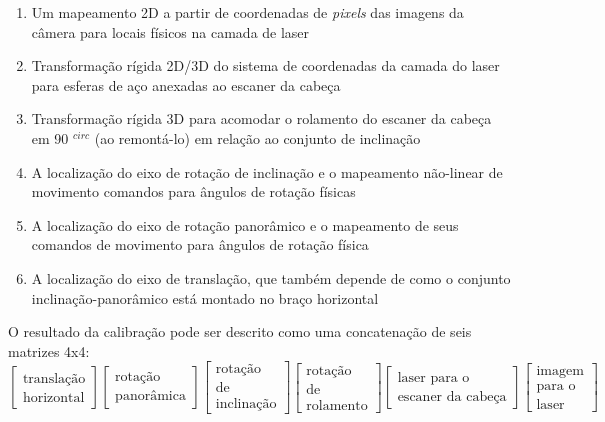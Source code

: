 \begin{enumerate}
\item{Um mapeamento 2D a partir de coordenadas de {\it pixels} das imagens da câmera para locais físicos na camada de laser}
\item{Transformação rígida 2D/3D do sistema de coordenadas da camada do laser para esferas de aço anexadas ao escaner da cabeça}
\item{Transformação rígida 3D para acomodar o rolamento do escaner da cabeça em 90 $^{circ}$ (ao remontá-lo) em relação ao conjunto de inclinação}
\item{A localização do eixo de rotação de inclinação e o mapeamento não-linear de movimento comandos para ângulos de rotação físicas}
\item{A localização do eixo de rotação panorâmico e o mapeamento de seus comandos de movimento para ângulos de rotação física}
\item{A localização do eixo de translação, que também depende de como o conjunto inclinação-panorâmico está montado no braço horizontal}
\end{enumerate}

O resultado da calibração pode ser descrito como uma concatenação de seis matrizes 4x4:
\[
\begin{bmatrix}
\text{translação} \\ 
\text{horizontal}
\end{bmatrix}
\begin{bmatrix}
\text{rotação} \\ 
\text{panorâmica}
\end{bmatrix}
\begin{bmatrix}
\text{rotação} \\
\text{de} \\
\text{inclinação}
\end{bmatrix}
\begin{bmatrix}
\text{rotação} \\
\text{de} \\
\text{rolamento}
\end{bmatrix}
\begin{bmatrix}
\text{laser para o} \\
\text{escaner }
\text{da cabeça}
\end{bmatrix}
\begin{bmatrix}
\text{imagem} \\
\text{para o} \\
\text{laser}
\end{bmatrix}
\]


